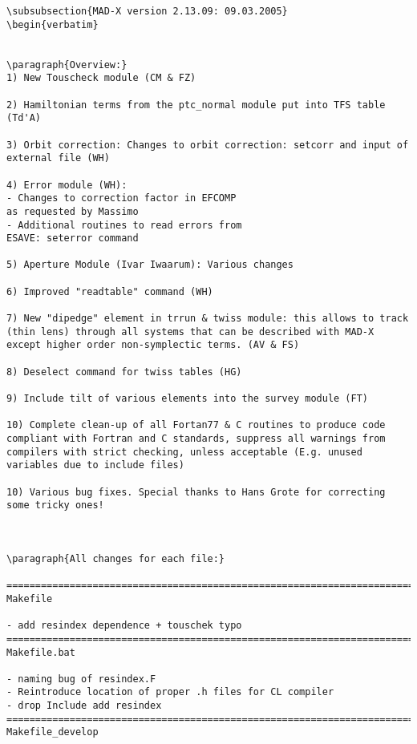 \begin{verbatim}
\subsubsection{MAD-X version 2.13.09: 09.03.2005}
\begin{verbatim}


\paragraph{Overview:}
1) New Touscheck module (CM & FZ)

2) Hamiltonian terms from the ptc_normal module put into TFS table
(Td'A)

3) Orbit correction: Changes to orbit correction: setcorr and input of
external file (WH)

4) Error module (WH): 
- Changes to correction factor in EFCOMP
as requested by Massimo
- Additional routines to read errors from
ESAVE: seterror command

5) Aperture Module (Ivar Iwaarum): Various changes

6) Improved "readtable" command (WH)

7) New "dipedge" element in trrun & twiss module: this allows to track
(thin lens) through all systems that can be described with MAD-X
except higher order non-symplectic terms. (AV & FS)

8) Deselect command for twiss tables (HG)

9) Include tilt of various elements into the survey module (FT)

10) Complete clean-up of all Fortan77 & C routines to produce code
compliant with Fortran and C standards, suppress all warnings from
compilers with strict checking, unless acceptable (E.g. unused
variables due to include files)

10) Various bug fixes. Special thanks to Hans Grote for correcting
some tricky ones!



\paragraph{All changes for each file:}

=============================================================================
Makefile

- add resindex dependence + touschek typo
=============================================================================
Makefile.bat

- naming bug of resindex.F
- Reintroduce location of proper .h files for CL compiler
- drop Include add resindex
=============================================================================
Makefile_develop


\end{verbatim}
